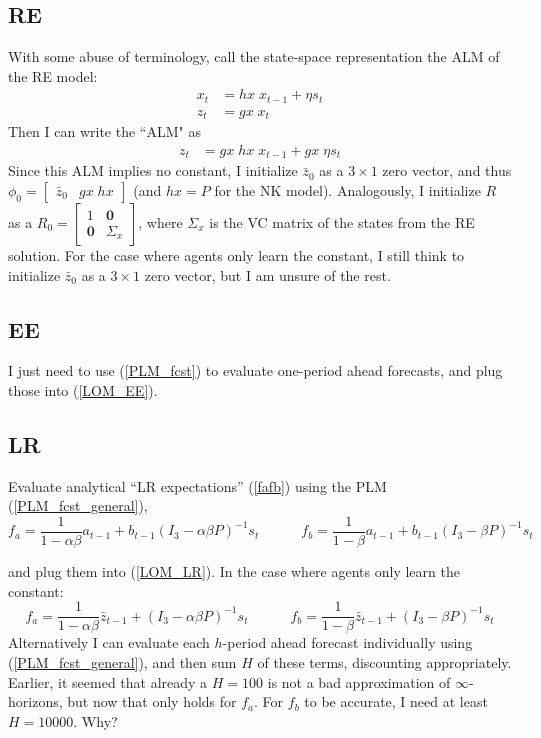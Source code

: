 \documentclass[11pt]{article}
\renewcommand{\[}{\begin{equation}}
\renewcommand{\]}{\end{equation}}
\begin{document}
\subsection{RE}
With some abuse of terminology, call the state-space representation the ALM of the RE model:
\begin{align}
x_{t} & = hx \; x_{t-1} + \eta s_t \label{state_eq}\\
z_t & = gx \; x_t \label{obs_eq}
\end{align}
Then I can write the ``ALM" as
\begin{align}
z_t & = gx \; hx \; x_{t-1} + gx \; \eta s_t  \label{ALM_RE}
\end{align}
Since this ALM implies no constant, I initialize $\bar{z}_0$ as a $3\times1$ zero vector, and thus $\phi_0 = \begin{bmatrix} \bar{z}_0 & gx \; hx\end{bmatrix} $ (and $hx = P$ for the NK model). Analogously, I initialize $R$ as a $R_0 = \begin{bmatrix} 1 & \mathbf{0} \\ \mathbf{0} & \Sigma_x \end{bmatrix}$, where $\Sigma_x$ is the VC matrix of the states from the RE solution. For the case where agents only learn the constant, I still think to initialize $\bar{z}_0$ as a $3\times1$ zero vector, but I am unsure of the rest.
\subsection{EE}
I just need to use (\ref{PLM_fcst}) to evaluate one-period ahead forecasts, and plug those into (\ref{LOM_EE}).

\subsection{LR}
Evaluate analytical ``LR expectations'' (\ref{fafb}) using the PLM (\ref{PLM_fcst_general}), 
\begin{equation}
f_a = \frac{1}{1-\alpha\beta}a_{t-1}  + b_{t-1}(I_3 - \alpha\beta P)^{-1}s_t \quad \quad \quad f_b = \frac{1}{1-\beta}a_{t-1}  + b_{t-1}(I_3 - \beta P)^{-1}s_t  \label{fafb_analytical_general}
\end{equation}

and plug them into (\ref{LOM_LR}). In the case where agents only learn the constant:
\begin{equation}
f_a = \frac{1}{1-\alpha\beta}\bar{z}_{t-1}  + (I_3 - \alpha\beta P)^{-1}s_t \quad \quad \quad f_b = \frac{1}{1-\beta}\bar{z}_{t-1}  + (I_3 - \beta P)^{-1}s_t  \label{fafb_analytical}
\end{equation}
Alternatively I can evaluate each $h$-period ahead forecast individually using (\ref{PLM_fcst_general}), and then sum $H$ of these terms, discounting appropriately. Earlier, it seemed that already a $H=100$ is not a bad approximation of $\infty$-horizons, but now that only holds for $f_a$. For $f_b$ to be accurate, I need at least $H=10000$. Why?
\end{document}
